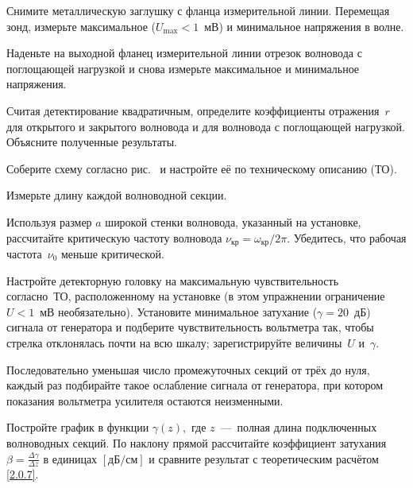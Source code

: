 \begin{lab:task}
    
    \item Снимите металлическую заглушку с фланца измерительной линии. Перемещая
    зонд, измерьте максимальное ($U_{\text{max}}<1$~мВ) и минимальное напряжения
    в волне.
    
    \item Наденьте на выходной фланец измерительной линии отрезок волновода с
    поглощающей нагрузкой и снова измерьте максимальное и минимальное напряжения.
    
    \item Считая детектирование квадратичным, определите коэффициенты 
    отражения~$r$ для открытого и закрытого волновода и для волновода 
    с поглощающей нагрузкой. Объясните полученные результаты.
    
    
    \item Соберите схему согласно рис.~ и настройте её по
    техническому описанию (ТО).
    
    \item Измерьте длину каждой волноводной секции.
    
    \item Используя размер $a$ широкой стенки волновода, указанный на установке,
    рассчитайте критическую частоту волновода $\nu_{кр}= \omega_{кр}/2\pi$. 
    Убедитесь, что рабочая частота~$\nu_0$ меньше критической.
    
    
    \item Настройте детекторную головку на максимальную чувствительность согласно~ТО, 
    расположенному на установке (в этом упражнении ограничение $U<1$~мВ
    необязательно). Установите минимальное затухание ($\gamma=20$~дБ) сигнала от
    генератора и подберите чувствительность вольтметра так, чтобы стрелка
    отклонялась почти на всю шкалу; зарегистрируйте величины~$U$ и~$\gamma$.
    
    \item Последовательно уменьшая число промежуточных секций от трёх до нуля,
    каждый раз подбирайте такое ослабление сигнала от генератора, при котором
    показания вольтметра усилителя остаются неизменными.
    
    \item Постройте график в функции $\gamma(z),$ где $z$~---~полная длина
    подключенных волноводных секций. По наклону прямой рассчитайте коэффициент
    затухания $\beta=\frac{\Delta\gamma}{\Delta z}$ 
    в единицах $[\text{дБ}/\text{см}]$ и сравните результат с теоретическим
    расчётом \eqref{2.0.7}.
 \end{lab:task}


